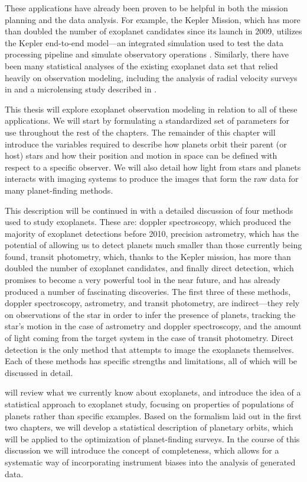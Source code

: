 These applications have already been proven to be helpful in both the mission planning and the data analysis.  For example, the Kepler Mission, which has more than doubled the number of exoplanet candidates since its launch in 2009, utilizes the Kepler end-to-end model---an integrated simulation used to  test the data processing pipeline and simulate observatory operations \citep{bryson2010kepler}.  Similarly, there have been many statistical analyses of the existing exoplanet data set that relied heavily on observation modeling, including the analysis of 
radial velocity surveys in \citet{cumming2008} and a microlensing study described in \citet{gould2010frequency}.

This thesis will explore exoplanet observation modeling in relation to all of these applications.  We will start by formulating a standardized set of parameters for use throughout the rest of the chapters.  The remainder of this chapter will introduce the variables required to describe how planets orbit their parent (or host) stars and how their position and motion in space can be defined with respect to a specific observer.  We will also detail how light from stars and planets interacts with imaging systems to produce the images that form the raw data for many planet-finding methods.  

This description will be continued in  with a detailed discussion of four methods used to study exoplanets.  These are: doppler spectroscopy, which produced the majority of exoplanet detections before 2010, precision astrometry, which has the potential of allowing us to detect planets much smaller than those currently being found, transit photometry, which, thanks to the Kepler mission, has more than doubled the number of exoplanet candidates, and finally direct detection, which promises to become a very powerful tool in the near future, and has already produced a number of fascinating discoveries.  The first three of these methods, doppler spectroscopy, astrometry, and transit photometry, are indirect---they rely on observations of the star in order to infer the presence of planets, tracking the star's motion in the case of astrometry and doppler spectroscopy, and the amount of light coming from the target system in the case of transit photometry.  Direct detection is the only method that attempts to image the exoplanets themselves.  Each of these methods has specific strengths and limitations, all of which will be discussed in detail.

 will review what we currently know about exoplanets, and introduce the idea of a statistical approach to exoplanet study, focusing on properties of populations of planets rather than specific examples.  Based on the formalism laid out in the first two chapters, we will develop a statistical description of planetary orbits, which will be applied to the optimization of planet-finding surveys.  In the course of this discussion we will introduce the concept of completeness, which allows for a systematic way of incorporating instrument biases into the analysis of generated data.

